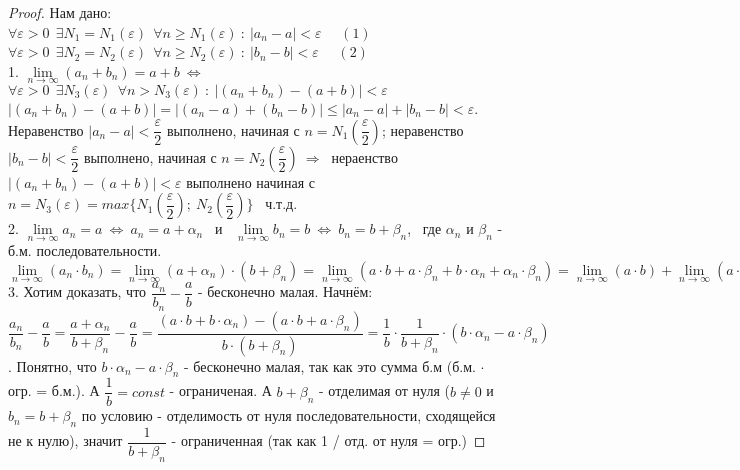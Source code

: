 \documentclass[12pt]{article}
\begin{document}
\begin{proof}
    Нам дано: \\
    $\forall \varepsilon  > 0 \ \ \exists N_1 = N_1(\varepsilon) \ \ \forall n \geq N_1(\varepsilon) \ : \  |a_n - a| < \varepsilon$ \ \ $(1)$ \\
    $\forall \varepsilon  > 0 \ \ \exists N_2 = N_2(\varepsilon) \ \ \forall n \geq N_2(\varepsilon) \ : \  |b_n - b| < \varepsilon$ \ \ $(2)$ \\
        1. $\lim\limits_{n \to \infty} (a_n + b_n) = a + b \ \Leftrightarrow \ $  $\forall \varepsilon > 0 \ \ \exists N_3(\varepsilon) \ \ \forall n > N_3(\varepsilon) \ : \  |(a_n+b_n) - (a + b)| < \varepsilon$ \\
        $|(a_n+b_n) - (a + b)| = |(a_n - a) + (b_n - b)| \leq |a_n - a| + |b_n - b| < \varepsilon$. \\
        Неравенство $|a_n-a| < \dfrac{\varepsilon}{2}$ выполнено, начиная с $n = N_1\left(\dfrac{\varepsilon}{2}\right)$; неравенство  $|b_n-b| < \dfrac{\varepsilon}{2}$ выполнено, начиная с $n = N_2\left(\dfrac{\varepsilon}{2}\right) \ \Rightarrow \ $ нераенство $ |(a_n+b_n) - (a + b)| < \varepsilon$ выполнено начиная с $n = N_3(\varepsilon) = max\{N_1\left(\dfrac{\varepsilon}{2}\right); \ N_2\left(\dfrac{\varepsilon}{2}\right)\}$  \ ч.т.д. \\
        2.  $\lim\limits_{n \to \infty} a_n = a \ \Leftrightarrow \ a_n = a + \alpha_n$ \ и \ $\lim\limits_{n \to \infty} b_n = b \ \Leftrightarrow \ b_n = b + \beta_n$, \ где $\alpha_n$ и $\beta_n$ - б.м. последовательности. \\
        $\lim\limits_{n \to \infty} (a_n \cdot b_n) = \lim\limits_{n \to \infty} (a + \alpha_n) \cdot (b + \beta_n) = \lim\limits_{n \to \infty} (a \cdot b + a \cdot \beta_n + b \cdot \alpha_n + \alpha_n \cdot \beta_n) = \lim\limits_{n \to \infty} (a \cdot b) + \lim\limits_{n \to \infty} (a \cdot \beta_n) + \lim\limits_{n \to \infty} (b \cdot \alpha_n) + \lim\limits_{n \to \infty} (\alpha_n \cdot \beta_n) = a \cdot b + 0 + 0 + 0 = a \cdot b$  \\
        3. Хотим доказать, что $\dfrac{a_n}{b_n} - \dfrac{a}{b}$ - бесконечно малая. Начнём: \\
        $\dfrac{a_n}{b_n} - \dfrac{a}{b} = \dfrac{a + \alpha_n}{b + \beta_n} - \dfrac{a}{b} = \dfrac{(a\cdot b + b \cdot \alpha_n) - (a \cdot b + a \cdot \beta_n)}{b \cdot (b + \beta_n)} = \dfrac{1}{b} \cdot \dfrac{1}{b + \beta_n} \cdot (b\cdot \alpha_n - a\cdot \beta_n)$. Понятно, что $b\cdot \alpha_n - a\cdot \beta_n$ - бесконечно малая, так как это сумма б.м (б.м. $\cdot$ огр. = б.м.). А $\dfrac{1}{b} = const$ - ограниченая. А $b + \beta_n$ - отделимая от нуля ($b \neq 0$ и $b_n = b + \beta_n$ по условию - отделимость от нуля последовательности, сходящейся не к нулю), значит $\dfrac{1}{b + \beta_n}$ - ограниченная (так как 1 / отд. от нуля = огр.) 
\end{proof}
\end{document}
